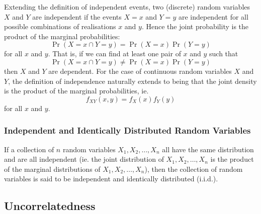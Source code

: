 \documentclass[11pt]{report} %
\begin{document}
Extending the definition of independent events, two (discrete) random variables $X$ and $Y$ are independent if the events $X = x$ and $Y = y$ are independent for all possible combinations of realisations $x$ and $y$. Hence the joint probability is the product of the marginal probabilities:
\begin{equation}
\operatorname{Pr}\left(X = x \cap Y = y\right) = \operatorname{Pr}\left(X = x\right)\operatorname{Pr}\left(Y = y\right)
\end{equation}
for all $x$ and $y$. That is, if we can find at least one pair of $x$ and $y$ such that
\begin{equation}
\operatorname{Pr}\left(X = x \cap Y = y\right) \neq \operatorname{Pr}\left(X = x\right)\operatorname{Pr}\left(Y = y\right)
\end{equation}
then $X$ and $Y$ are dependent. For the case of continuous random variables $X$ and $Y$, the definition of independence naturally extends to being that the joint density is the product of the marginal probabilities, ie.
\begin{equation}
f_{XY}\left(x, y\right) = f_{X}\left(x\right)f_{Y}\left(y\right)
\end{equation}
for all $x$ and $y$.

\subsubsection{Independent and Identically Distributed Random Variables}

If a collection of $n$ random variables $X_{1}, X_{2}, \dots, X_{n}$ all have the same distribution and are all independent (ie. the joint distribution of $X_{1}, X_{2}, \dots, X_{n}$ is the product of the marginal distributions of $X_{1}, X_{2}, \dots, X_{n}$), then the collection of random variables is said to be independent and identically distributed (i.i.d.).

\subsection{Uncorrelatedness}
\end{document}
